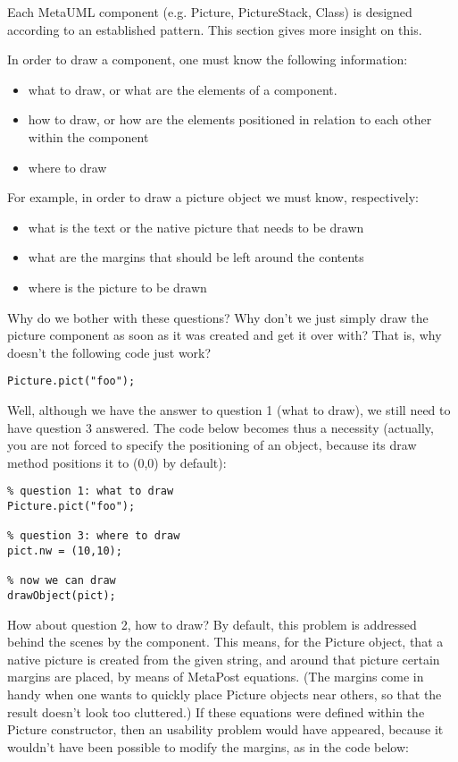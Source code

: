 \documentclass{article}
\newcommand{\code}{\ttfamily}
\begin{document}
Each MetaUML component (e.g. {\code Picture}, {\code PictureStack}, {\code Class}) is
designed according to an established pattern. This section gives more insight
on this.

In order to draw a component, one must know the following information:
\begin{itemize}
\item what to draw, or what are the elements of a component.
\item how to draw, or how are the elements positioned in relation to each other within the component
\item where to draw
\end{itemize}

For example, in order to draw a picture object we must know, respectively:
\begin{itemize}
\item what is the text or the native picture that needs to be drawn
\item what are the margins that should be left around the contents
\item where is the picture to be drawn
\end{itemize}

Why do we bother with these questions? Why don't we just simply draw the picture
component as soon as it was created and get it over with?
That is, why doesn't the following code just work?

\begin{verbatim}
Picture.pict("foo");
\end{verbatim}

Well, although we have the answer to question 1 (what to draw),
we still need to have question 3 answered. The code below becomes thus a
necessity (actually, you are not forced to specify the positioning of an object,
because its draw method positions it to {\code (0,0)} by default):

\begin{verbatim}
% question 1: what to draw
Picture.pict("foo");

% question 3: where to draw
pict.nw = (10,10);

% now we can draw
drawObject(pict);
\end{verbatim}

How about question 2, how to draw? By default, this problem is addressed behind the
scenes by the component. This means, for the Picture object, that a native picture is created
from the given string, and around that picture certain margins are placed, by means of MetaPost equations.
(The margins come in handy when one wants to quickly place Picture objects near others,
so that the result doesn't look too cluttered.)
If these equations were defined within the Picture constructor, then an
usability problem would have appeared, because it wouldn't have been possible to modify the margins,
as in the code below:
\end{document}
